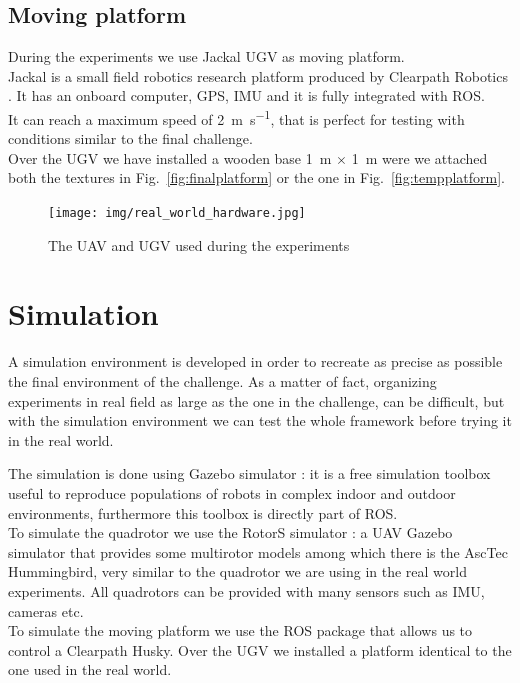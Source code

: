 \subsection{Moving platform}
During the experiments we use Jackal UGV as moving platform.\\ 
Jackal is a small field robotics research platform produced by Clearpath Robotics \cite{clearpathrobotics}. It has an onboard computer, GPS, IMU and it is fully integrated with ROS.\\
It can reach a maximum speed of \SI{2}{\meter \per \second}, that is perfect for testing with conditions similar to the final challenge.\\
Over the UGV we have installed a wooden base \SI{1}{\meter} $\times$ \SI{1}{\meter} were we attached both the textures in Fig.~\ref{fig:finalplatform} or the one in Fig.~\ref{fig:tempplatform}.

\begin{figure}[!ht]
    \centering
    \texttt{[image: img/real\_world\_hardware.jpg]}
    \caption{The UAV and UGV used during the experiments}
    \label{fig:quad_hardware}
\end{figure}


\section{Simulation}
A simulation environment is developed in order to recreate as precise as possible the final environment of the challenge.  As a matter of fact, organizing experiments in real field as large as the one in the challenge, can be difficult, but with the simulation environment we can test the whole framework before trying it in the real world.

The simulation is done using Gazebo simulator \cite{gazebosimulator}: it is a free simulation toolbox useful to reproduce populations of robots in complex indoor and outdoor environments, furthermore this toolbox is directly part of ROS.\\
To simulate the quadrotor we use the RotorS simulator \cite{rotors2016}: a UAV Gazebo simulator that provides some multirotor models among which there is the AscTec Hummingbird, very similar to the quadrotor we are using in the real world experiments. All quadrotors can be provided with many sensors such as IMU, cameras etc. \\
To simulate the moving platform we use the ROS package \cite{RobotsHusky} that allows us to control a Clearpath Husky. Over the UGV we installed a platform identical to the one used in the real world.\\

